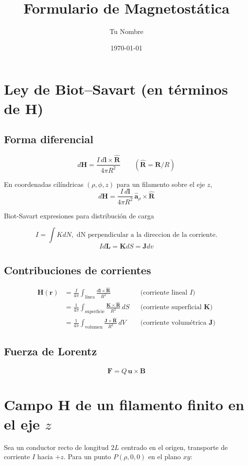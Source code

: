 \documentclass[11pt]{article}
\title{Formulario de Magnetostática}
\author{Tu Nombre}
\date{\today}
\begin{document}
\section{Ley de Biot–Savart (en términos de \(\mathbf{H}\))}
\subsection*{Forma diferencial}
\[
d\mathbf{H}
  =\frac{I\,d\mathbf{l}\times\hat{\mathbf{R}}}{4\pi R^{2}}
\qquad
(\hat{\mathbf{R}}=\mathbf{R}/R)
\]

En coordenadas cilíndricas \(({\rho},\phi,z)\) para un filamento sobre el eje \(z\),
\[
d\mathbf{H}= \frac{I\,d\mathbf{l}}{4\pi R^{2}}
             \,\hat{\boldsymbol{a}}_{{\rho}}
             \times\hat{\mathbf{R}}
\]

Biot-Savart expresiones para distribución de carga 

\[
I=\int KdN, \text{ dN perpendicular a la direccion de la corriente.}
\]
\[ Id\mathbf{L}=\mathbf{K}dS=\mathbf{J}dv
\]


\subsection*{Contribuciones de corrientes}
\begin{align}
\mathbf{H}(\mathbf{r})
  &=\frac{I}{4\pi}\int_{\text{línea}}
      \frac{d\mathbf{l}\times\hat{\mathbf{R}}}{R^{2}}
      &&\text{(corriente lineal \(I\))}\\[6pt]
  &=\frac{1}{4\pi}\int_{\text{superficie}}
      \frac{\mathbf{K}\times\hat{\mathbf{R}}}{R^{2}}\,
      dS
      &&\text{(corriente superficial \(\mathbf{K}\))}\\[6pt]
  &=\frac{1}{4\pi}\int_{\text{volumen}}
      \frac{\mathbf{J}\times\hat{\mathbf{R}}}{R^{2}}\,
      dV
      &&\text{(corriente volumétrica \(\mathbf{J}\))}
\end{align}

\subsection*{Fuerza de Lorentz}
\begin{align}
\mathbf{F}=Q\,\mathbf{u}\times\mathbf{B}
\end{align}

\section{Campo \(\mathbf{H}\) de un filamento finito en el eje \(z\)}
Sea un conductor recto de longitud \(2L\) centrado en el origen,
transporte de corriente \(I\) hacia \(+z\).
Para un punto \(P({\rho},0,0)\) en el plano \(xy\):
\end{document}
